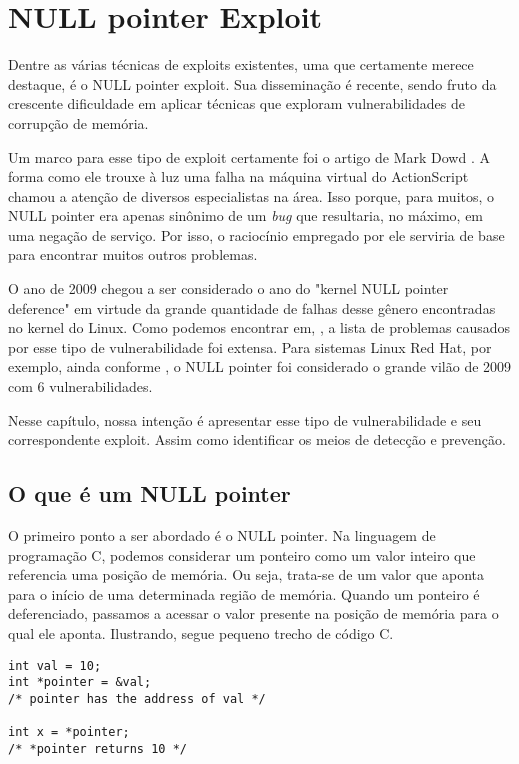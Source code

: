 
\chapter{NULL pointer Exploit}
\label{chap:null_pointer_exploit}

	Dentre as várias técnicas de exploits existentes, uma que certamente merece
	destaque, é o NULL pointer exploit.
	Sua disseminação é recente, sendo fruto da crescente dificuldade em aplicar técnicas
	que exploram vulnerabilidades de corrupção de memória.
	

	Um marco para esse tipo de exploit certamente foi o artigo de Mark Dowd \cite{Dowd2008}.
	A forma como ele trouxe à luz uma falha na máquina virtual do ActionScript chamou
	a atenção de diversos especialistas na área. 
	Isso porque, para muitos, o NULL pointer era apenas sinônimo de um \textsl{bug}
	que resultaria, no máximo, em uma negação de serviço.
	Por isso, o raciocínio empregado por ele serviria de base para encontrar muitos outros problemas.

	
	O ano de 2009 chegou a ser considerado o ano do "kernel NULL pointer deference"
	em virtude da grande quantidade de falhas desse gênero encontradas no kernel do Linux.
	Como podemos encontrar em, \cite{Cox2009Top11}, a lista de problemas causados
	por esse tipo de vulnerabilidade foi extensa. Para sistemas Linux Red Hat, por exemplo,
	ainda conforme \cite{Cox2009Top11}, o NULL pointer foi considerado o grande vilão de 2009 com
	6 vulnerabilidades.

	
	Nesse capítulo, nossa intenção é apresentar esse tipo de vulnerabilidade e seu
	correspondente exploit. Assim como identificar os meios de detecção e prevenção. 
	
	
	\section{O que é um NULL pointer}
		O primeiro ponto a ser abordado é o NULL pointer.
		Na linguagem de programação C, podemos considerar um ponteiro como um valor inteiro
		que referencia uma posição de memória. Ou seja, trata-se de um valor que aponta
		para o início de uma determinada região de memória. Quando um ponteiro é deferenciado,
		passamos a acessar o valor presente na posição de memória para o qual ele aponta.
		Ilustrando, segue pequeno trecho de código C.
		\begin{lstlisting}[label=pointer_example,caption=Ponteiro em C]
int val = 10;
int *pointer = &val;
/* pointer has the address of val */

int x = *pointer;
/* *pointer returns 10 */
		\end{lstlisting}
		

